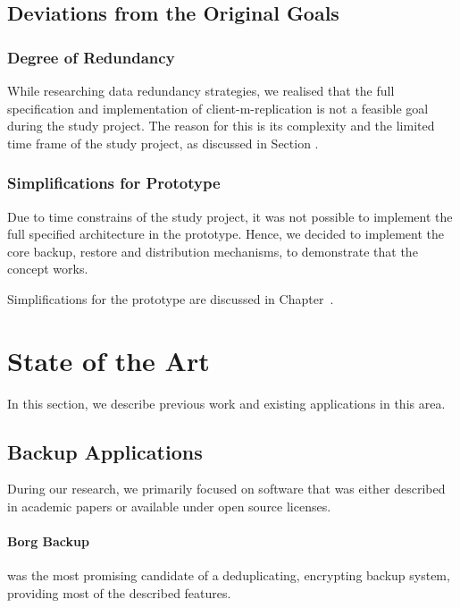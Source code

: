 \subsection{Deviations from the Original Goals}\label{sec:deviations-from-original-goals}

\subsubsection{Degree of Redundancy}
While researching data redundancy strategies, we realised that the full specification and implementation of \gls{client-m-replication} is not a feasible goal during the study project. The reason for this is its complexity and the limited time frame of the study project, as discussed in Section .

\subsubsection{Simplifications for Prototype}
Due to time constrains of the study project, it was not possible to implement the full specified architecture in the prototype. Hence, we decided to implement the core backup, restore and distribution mechanisms, to demonstrate that the concept works.

Simplifications for the prototype are discussed in Chapter~.

\section{State of the Art}\label{sec:state-of-the-art}
In this section, we describe previous work and existing applications in this area.

\subsection{Backup Applications}
During our research, we primarily focused on software that was either described in academic papers or available under open source licenses.

\paragraph{Borg Backup} \cite{borg-backup} was the most promising candidate of a deduplicating, encrypting backup system, providing most of the described features.

